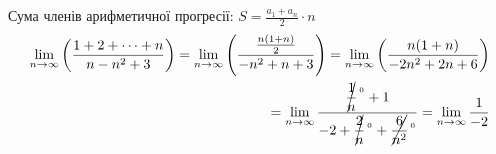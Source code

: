 \documentclass[../rgr1.tex]{subfiles}
\begin{document}
\Problem{Обчислити границю числової послідовності
$\lim_{n\to\infty}\left( \frac{1+2+\dots+n}{n-n^2+3} \right)$}
\Solution
Сума членів арифметичної прогресії: $S = \frac{a_1+a_n}{2}\cdot n$
\begin{equation}
	\begin{aligned}
		\lim_{n\to\infty}\left( \frac{1+2+\dots+n}{n-n^2+3} \right)
		=\lim_{n\to\infty}\left( \frac{\frac{n(1+n)}{2}}{-n^2+n+3} \right)
		=\lim_{n\to\infty}\left( \frac{n(1+n)}{-2n^2+2n+6} \right)\\
		=\lim_{n\to{\infty}}{\dfrac{{\cancel{\dfrac{1}{n}}^{\,\Large{^{0}}}}+1}{-2+\cancel{\dfrac{2}{n}}^{\,\Large{^{0}}}+{\cancel{\dfrac{6}{n^{2}}}^{\,\Large{^{0}}}}}}=\lim_{n\to{\infty}}{\dfrac{1}{-2}}
	\end{aligned}
\end{equation}
\end{document}

